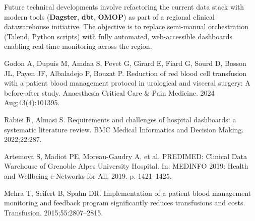 \documentclass{IOS-Book-Article}
\begin{document}
Future technical developments involve refactoring the current data stack with modern 
tools (\textbf{Dagster}, \textbf{dbt}, \textbf{OMOP}) as part of a regional clinical 
datawarehouse initiative. The objective is to replace semi-manual orchestration 
(Talend, Python scripts) with fully automated, web-accessible dashboards enabling 
real-time monitoring across the region.
\begin{thebibliography}{99}

Godon A, Dupuis M, Amdaa S, Pevet G, Girard E, Fiard G, Sourd D, Bosson JL, Payen JF, Albaladejo P, Bouzat P. Reduction of red blood cell transfusion with a patient blood management protocol in urological and visceral surgery: A before-after study. Anaesthesia Critical Care \& Pain Medicine. 2024 Aug;43(4):101395.

Rabiei R, Almasi S. Requirements and challenges of hospital dashboards: a systematic literature review. BMC Medical Informatics and Decision Making. 2022;22:287.

Artemova S, Madiot PE, Moreau-Gaudry A, et al. PREDIMED: Clinical Data Warehouse of Grenoble Alpes University Hospital. In: MEDINFO 2019: Health and Wellbeing e-Networks for All. 2019. p. 1421--1425.

Mehra T, Seifert B, Spahn DR. Implementation of a patient blood management monitoring and feedback program significantly reduces transfusions and costs. Transfusion. 2015;55:2807--2815.

\end{thebibliography}
\end{document}
